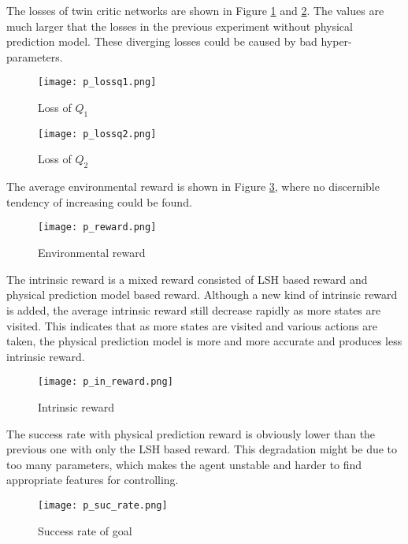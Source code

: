 \documentclass[a4paper, 12pt]{report}
\begin{document}
The losses of twin critic networks are shown in Figure \ref{p_lossq1} and \ref{p_lossq2}. The values are much larger that the losses in the previous experiment without physical prediction model. These diverging losses could be caused by bad hyper-parameters.


        \begin{figure}[H]
        \centering
        \texttt{[image: p\_lossq1.png]}
        \caption{Loss of $Q_1$}
            \label{p_lossq1}
        \end{figure}

        \begin{figure}[H]
        \centering
        \texttt{[image: p\_lossq2.png]}
        \caption{Loss of $Q_2$}
            \label{p_lossq2}
        \end{figure}

The average environmental reward is shown in Figure \ref{p_reward}, where no discernible tendency of increasing could be found.

        \begin{figure}[H]
        \centering
        \texttt{[image: p\_reward.png]}
        \caption{Environmental reward}
            \label{p_reward}
        \end{figure}

The intrinsic reward is a mixed reward consisted of LSH based reward and physical prediction model based reward. Although a new kind of intrinsic reward is added, the average intrinsic reward still decrease rapidly as more states are visited. This indicates that as more states are visited and various actions are taken, the physical prediction model is more and more accurate and produces less intrinsic reward.

        \begin{figure}[H]
        \centering
        \texttt{[image: p\_in\_reward.png]}
        \caption{Intrinsic reward}
            \label{p_in_reward}
        \end{figure}

The success rate with physical prediction reward is obviously lower than the previous one with only the LSH based reward. This degradation might be due to too many parameters, which makes the agent unstable and harder to find appropriate features for controlling.

        \begin{figure}[H]
        \centering
        \texttt{[image: p\_suc\_rate.png]}
        \caption{Success rate of goal}
        \end{figure}
\end{document}
